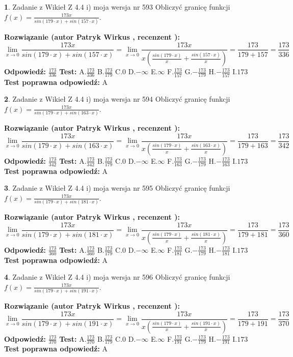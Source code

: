 \documentclass[12pt, a4paper]{article}
\theoremstyle{definition} %
\newtheorem{zad}{}
\newcommand{\zadStart}[1]{\begin{zad}#1\newline}
\newcommand{\zadStop}{\end{zad}}
\newcommand{\rozwStart}[2]{\noindent \textbf{Rozwiązanie (autor #1 , recenzent #2): }\newline}
\newcommand{\rozwStop}{\newline}
\newcommand{\odpStart}{\noindent \textbf{Odpowiedź:}\newline}
\newcommand{\odpStop}{\newline}
\newcommand{\testStart}{\noindent \textbf{Test:}\newline}
\newcommand{\testStop}{\newline}
\newcommand{\kluczStart}{\noindent \textbf{Test poprawna odpowiedź:}\newline}
\newcommand{\kluczStop}{\newline}
\begin{document}
\zadStart{Zadanie z Wikieł Z 4.4 i) moja wersja nr 593}
Obliczyć granicę funkcji $f(x)=\frac{173x}{sin(179\cdot x) +sin(157\cdot x)}$.
\zadStop
\rozwStart{Patryk Wirkus}{}
$$\lim\limits_{x\to 0}\frac{173x}{sin(179\cdot x) +sin(157\cdot x)}=\lim\limits_{x\to 0}\frac{173x}{x(\frac{sin(179\cdot x)}{x}+\frac{sin(157\cdot x)}{x})}=\frac{173}{179+157} = \frac{173}{336}$$
\rozwStop
\odpStart
$\frac{173}{336}$
\odpStop
\testStart
A.$\frac{173}{336}$
B.$\frac{173}{179}$
C.$0$
D.$-\infty$
E.$\infty$
F.$\frac{173}{157}$
G.$-\frac{173}{179}$
H.$-\frac{173}{157}$
I.$173$
\testStop
\kluczStart
A
\kluczStop



\zadStart{Zadanie z Wikieł Z 4.4 i) moja wersja nr 594}
Obliczyć granicę funkcji $f(x)=\frac{173x}{sin(179\cdot x) +sin(163\cdot x)}$.
\zadStop
\rozwStart{Patryk Wirkus}{}
$$\lim\limits_{x\to 0}\frac{173x}{sin(179\cdot x) +sin(163\cdot x)}=\lim\limits_{x\to 0}\frac{173x}{x(\frac{sin(179\cdot x)}{x}+\frac{sin(163\cdot x)}{x})}=\frac{173}{179+163} = \frac{173}{342}$$
\rozwStop
\odpStart
$\frac{173}{342}$
\odpStop
\testStart
A.$\frac{173}{342}$
B.$\frac{173}{179}$
C.$0$
D.$-\infty$
E.$\infty$
F.$\frac{173}{163}$
G.$-\frac{173}{179}$
H.$-\frac{173}{163}$
I.$173$
\testStop
\kluczStart
A
\kluczStop



\zadStart{Zadanie z Wikieł Z 4.4 i) moja wersja nr 595}
Obliczyć granicę funkcji $f(x)=\frac{173x}{sin(179\cdot x) +sin(181\cdot x)}$.
\zadStop
\rozwStart{Patryk Wirkus}{}
$$\lim\limits_{x\to 0}\frac{173x}{sin(179\cdot x) +sin(181\cdot x)}=\lim\limits_{x\to 0}\frac{173x}{x(\frac{sin(179\cdot x)}{x}+\frac{sin(181\cdot x)}{x})}=\frac{173}{179+181} = \frac{173}{360}$$
\rozwStop
\odpStart
$\frac{173}{360}$
\odpStop
\testStart
A.$\frac{173}{360}$
B.$\frac{173}{179}$
C.$0$
D.$-\infty$
E.$\infty$
F.$\frac{173}{181}$
G.$-\frac{173}{179}$
H.$-\frac{173}{181}$
I.$173$
\testStop
\kluczStart
A
\kluczStop



\zadStart{Zadanie z Wikieł Z 4.4 i) moja wersja nr 596}
Obliczyć granicę funkcji $f(x)=\frac{173x}{sin(179\cdot x) +sin(191\cdot x)}$.
\zadStop
\rozwStart{Patryk Wirkus}{}
$$\lim\limits_{x\to 0}\frac{173x}{sin(179\cdot x) +sin(191\cdot x)}=\lim\limits_{x\to 0}\frac{173x}{x(\frac{sin(179\cdot x)}{x}+\frac{sin(191\cdot x)}{x})}=\frac{173}{179+191} = \frac{173}{370}$$
\rozwStop
\odpStart
$\frac{173}{370}$
\odpStop
\testStart
A.$\frac{173}{370}$
B.$\frac{173}{179}$
C.$0$
D.$-\infty$
E.$\infty$
F.$\frac{173}{191}$
G.$-\frac{173}{179}$
H.$-\frac{173}{191}$
I.$173$
\testStop
\kluczStart
A
\kluczStop
\end{document}
